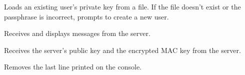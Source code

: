 \documentclass[letterpaper,10pt,english]{sphinxmanual}
\begin{document}
\begin{fulllineitems}
\begin{fulllineitems}
\end{fulllineitems}


\begin{fulllineitems}
\label{\detokenize{client1:client1.Client.load_existing_user}}
\pysigstartsignatures
{}
\pysigstopsignatures
\sphinxAtStartPar
Loads an existing user’s private key from a file.
If the file doesn’t exist or the passphrase is incorrect, prompts to create a new user.

\end{fulllineitems}


\begin{fulllineitems}
\label{\detokenize{client1:client1.Client.receive_messages}}
\pysigstartsignatures
{}
\pysigstopsignatures
\sphinxAtStartPar
Receives and displays messages from the server.

\end{fulllineitems}


\begin{fulllineitems}
\label{\detokenize{client1:client1.Client.receive_public_key_and_mac_key}}
\pysigstartsignatures
{}
\pysigstopsignatures
\sphinxAtStartPar
Receives the server’s public key and the encrypted MAC key from the server.

\end{fulllineitems}


\begin{fulllineitems}
\label{\detokenize{client1:client1.Client.remove_last_line}}
\pysigstartsignatures
{}
\pysigstopsignatures
\sphinxAtStartPar
Removes the last line printed on the console.


\end{fulllineitems}
\end{fulllineitems}
\end{document}
